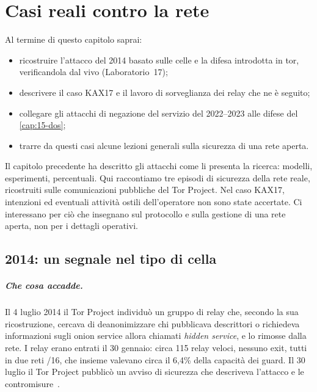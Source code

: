 \chapter{Casi reali contro la rete}\label{cap:27-casi-rete}

\begin{obiettivi}
Al termine di questo capitolo saprai:
\begin{itemize}[nosep]
  \item ricostruire l'attacco del 2014 basato sulle celle  e la difesa introdotta in tor, verificandola dal vivo (Laboratorio~17);
  \item descrivere il caso KAX17 e il lavoro di sorveglianza dei relay che ne è seguito;
  \item collegare gli attacchi di negazione del servizio del 2022--2023 alle difese del \cref{cap:15-dos};
  \item trarre da questi casi alcune lezioni generali sulla sicurezza di una rete aperta.
\end{itemize}
\end{obiettivi}

Il capitolo precedente ha descritto gli attacchi come li presenta la ricerca: modelli, esperimenti, percentuali. Qui raccontiamo tre episodi di sicurezza della rete reale, ricostruiti sulle comunicazioni pubbliche del Tor Project. Nel caso KAX17, intenzioni ed eventuali attività ostili dell'operatore non sono state accertate. Ci interessano per ciò che insegnano sul protocollo e sulla gestione di una rete aperta, non per i dettagli operativi.

\section{2014: un segnale nel tipo di cella}\label{sec:casi-relayearly}

\paragraph{Che cosa accadde.} Il 4 luglio 2014 il Tor Project individuò un gruppo di relay che, secondo la sua ricostruzione, cercava di deanonimizzare chi pubblicava descrittori o richiedeva informazioni sugli onion service allora chiamati \emph{hidden service}, e lo rimosse dalla rete. I relay erano entrati il 30 gennaio: circa 115 relay veloci, nessuno exit, tutti in due reti /16, che insieme valevano circa il 6,4\% della capacità dei guard. Il 30 luglio il Tor Project pubblicò un avviso di sicurezza che descriveva l'attacco e le contromisure~\cite{torblog2014relayearly}.

